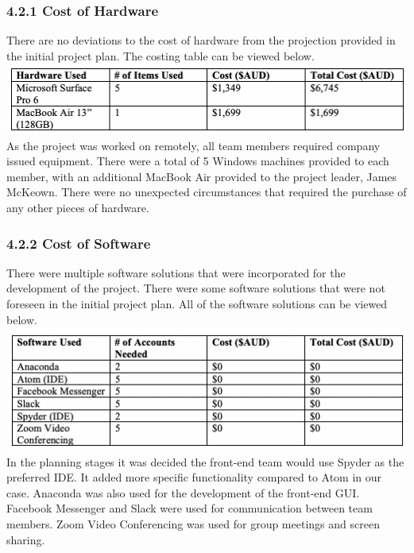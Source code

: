 \documentclass[11pt]{article}
\begin{document}
\begin{adjustwidth}{1cm}{}

\subsubsection{4.2.1 Cost of Hardware}
There are no deviations to the cost of hardware from the projection provided in the initial project plan. The costing table can be viewed below. \\

\includegraphics[scale=0.71]{hardware_table.png} \\

As the project was worked on remotely, all team members required company issued equipment. There were a total of 5 Windows machines provided to each member, with an additional MacBook Air provided to the project leader, James McKeown. There were no unexpected circumstances that required the purchase of any other pieces of hardware.

\subsubsection{4.2.2 Cost of Software}
There were multiple software solutions that were incorporated for the development of the project. There were some software solutions that were not foreseen in the initial project plan. All of the software solutions can be viewed below. \\

\includegraphics[scale=0.71]{software_table.png} \\

In the planning stages it was decided the front-end team would use Spyder as the preferred IDE. It added more specific functionality compared to Atom in our case. Anaconda was also used for the development of the front-end GUI. Facebook Messenger and Slack were used for communication between team members. Zoom Video Conferencing was used for group meetings and screen sharing. \\


\end{adjustwidth}
\end{document}
